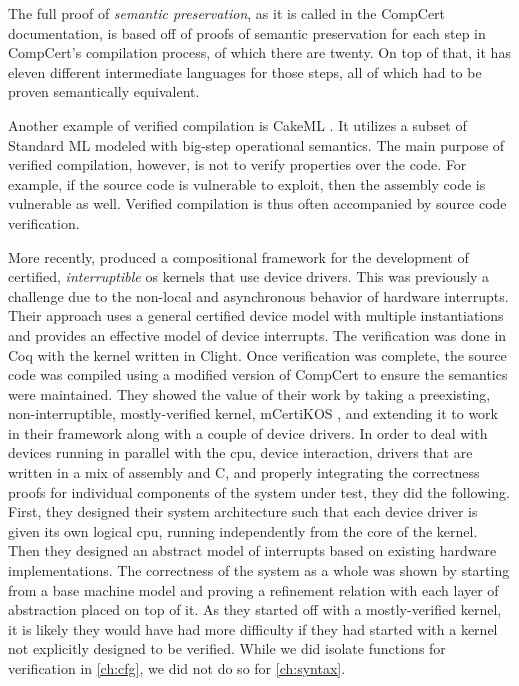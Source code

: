 The full proof of \emph{semantic preservation},
as it is called in the CompCert documentation,
is based off of proofs of semantic preservation
for each step in CompCert's compilation process, of which there are twenty.
On top of that, it has eleven different intermediate languages for those steps,
all of which had to be proven semantically equivalent.

Another example of verified compilation is CakeML \autocite{kumar2014cakeml}.
It utilizes a subset of Standard ML modeled with big-step operational semantics.
The main purpose of verified compilation, however,
is not to verify properties over the code.
For example, if the source code is vulnerable to  exploit,
then the assembly code is vulnerable as well.
Verified compilation is thus often accompanied by source code verification.

More recently, \textcite{chen2018compositional} produced a compositional framework
for the development of certified, \emph{interruptible}%
\ac{os} kernels that use device drivers.%
This was previously a challenge due to the non-local and asynchronous behavior
of hardware interrupts. Their approach uses a general certified device model
with multiple instantiations and provides an effective model of device interrupts.
The verification was done in Coq with the kernel written in Clight.
Once verification was complete, the source code was compiled using a modified version
of CompCert to ensure the semantics were maintained.
They showed the value of their work by taking a preexisting,
non-interruptible, mostly-verified kernel, mCertiKOS \autocite{costanzo2016endtoend},
and extending it to work in their framework along with a couple of device drivers.
In order to deal with devices running in parallel with the \ac{cpu},
device interaction, drivers that are written in a mix of assembly and C,
and properly integrating the correctness proofs for individual components
of the system under test, they did the following.
First, they designed their system architecture such that each device driver
is given its own logical \ac{cpu}, running independently from the core of the kernel.
Then they designed an abstract model of interrupts
based on existing hardware implementations.
The correctness of the system as a whole was shown
by starting from a base machine model
and proving a refinement relation with each layer of abstraction placed on top of it.
As they started off with a mostly-verified kernel, it is likely they would have had
more difficulty if they had started with a kernel
not explicitly designed to be verified. While we did isolate functions
for verification in \cref{ch:cfg}, we did not do so for \cref{ch:syntax}.


